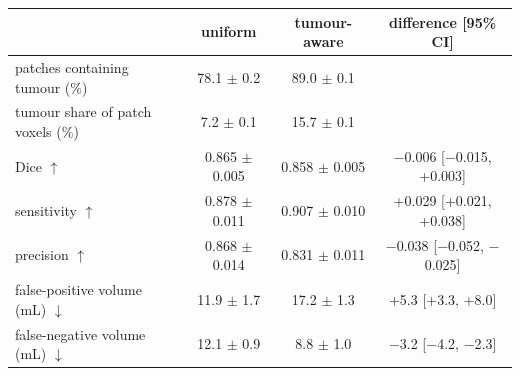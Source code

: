 \begin{tabular}{lccc}
\toprule
 & uniform & tumour-aware & difference [95\% CI] \\
\midrule
patches containing tumour (\%) & 78.1 $\pm$ 0.2 & 89.0 $\pm$ 0.1 & \\
tumour share of patch voxels (\%) & 7.2 $\pm$ 0.1 & 15.7 $\pm$ 0.1 & \\
\midrule
Dice $\uparrow$ & 0.865 $\pm$ 0.005 & 0.858 $\pm$ 0.005 & $-$0.006 [$-$0.015, +0.003] \\
sensitivity $\uparrow$ & 0.878 $\pm$ 0.011 & 0.907 $\pm$ 0.010 & +0.029 [+0.021, +0.038] \\
precision $\uparrow$ & 0.868 $\pm$ 0.014 & 0.831 $\pm$ 0.011 & $-$0.038 [$-$0.052, $-$0.025] \\
false-positive volume (mL) $\downarrow$ & 11.9 $\pm$ 1.7 & 17.2 $\pm$ 1.3 & +5.3 [+3.3, +8.0] \\
false-negative volume (mL) $\downarrow$ & 12.1 $\pm$ 0.9 & 8.8 $\pm$ 1.0 & $-$3.2 [$-$4.2, $-$2.3] \\
\bottomrule
\end{tabular}